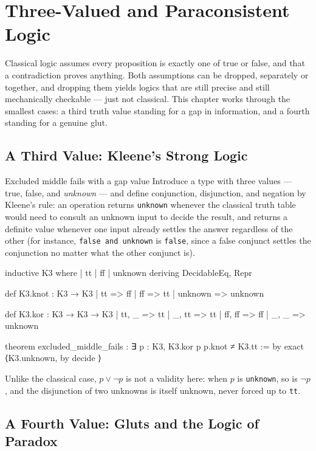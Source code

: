 \chapter{Three-Valued and Paraconsistent Logic}
\label{ch:nonclassical}

Classical logic assumes every proposition is exactly one of true or
false, and that a contradiction proves anything. Both assumptions
can be dropped, separately or together, and dropping them yields
logics that are still precise and still mechanically checkable —
just not classical. This chapter works through the smallest cases:
a third truth value standing for a gap in information, and a fourth
standing for a genuine glut.

\section{A Third Value: Kleene's Strong Logic}

\begin{experiment}{Excluded middle fails with a gap value}
Introduce a type with three values — true, false, and
\emph{unknown} — and define conjunction, disjunction, and negation
by Kleene's rule: an operation returns \texttt{unknown} whenever the
classical truth table would need to consult an unknown input to
decide the result, and returns a definite value whenever one input
already settles the answer regardless of the other (for instance,
\texttt{false and unknown} is \texttt{false}, since a false
conjunct settles the conjunction no matter what the other conjunct
is).
\begin{lean}
inductive K3 where
  | tt | ff | unknown
  deriving DecidableEq, Repr

def K3.knot : K3 → K3
  | tt => ff
  | ff => tt
  | unknown => unknown

def K3.kor : K3 → K3 → K3
  | tt, _ => tt
  | _, tt => tt
  | ff, ff => ff
  | _, _ => unknown

theorem excluded_middle_fails :
    ∃ p : K3, K3.kor p p.knot ≠ K3.tt := by
  exact ⟨K3.unknown, by
    decide ⟩
\end{lean}
Unlike the classical case, $p \lor \lnot p$ is not a validity here:
when $p$ is \texttt{unknown}, so is $\lnot p$, and the disjunction of
two unknowns is itself unknown, never forced up to \texttt{tt}.
\end{experiment}

\section{A Fourth Value: Gluts and the Logic of Paradox}

